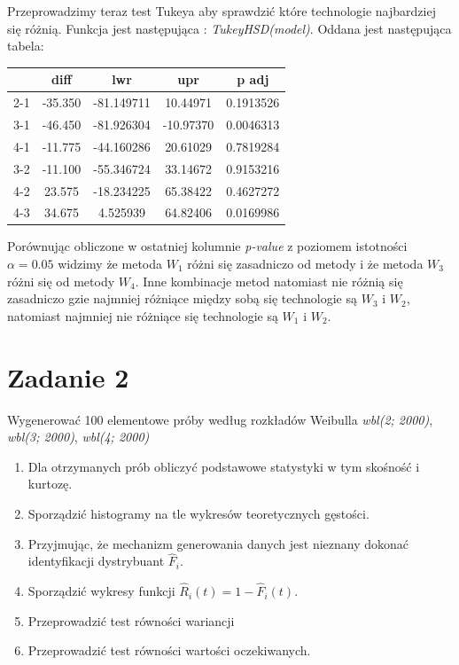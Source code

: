 \documentclass{article}
\begin{document}
Przeprowadzimy teraz test Tukeya aby sprawdzić które technologie najbardziej się różnią. Funkcja jest następująca : \textit{TukeyHSD(model)}. Oddana jest następująca tabela:
\begin{center} \begin{tabular}{|c|c|c|c|c|} \hline
& diff & lwr & upr & p adj \\ \hline
2-1 & -35.350 & -81.149711 & 10.44971 & 0.1913526 \\ \hline
3-1 & -46.450 & -81.926304 & -10.97370 & 0.0046313 \\ \hline
4-1 & -11.775 & -44.160286 & 20.61029 & 0.7819284 \\ \hline
3-2 & -11.100 & -55.346724 & 33.14672 & 0.9153216 \\ \hline
4-2 & 23.575 & -18.234225 & 65.38422 & 0.4627272 \\ \hline
4-3 & 34.675 & 4.525939 & 64.82406 & 0.0169986 \\ \hline
\end{tabular} \end{center}
Porównując obliczone w ostatniej kolumnie \textit{p-value} z poziomem istotności $\alpha = 0.05$ widzimy że metoda $W_1$ różni się zasadniczo od metody i że metoda $W_3$ różni się od metody $W_4$. Inne kombinacje metod natomiast nie różnią się zasadniczo gzie najmniej różniące między sobą się technologie są $W_3$ i $W_2$, natomiast najmniej nie różniące się technologie są $W_1$ i $W_2$. 

\newpage
\section{Zadanie 2}
Wygenerować 100 elementowe próby według rozkładów Weibulla \textit{wbl(2; 2000)}, \textit{wbl(3; 2000)}, \textit{wbl(4; 2000)}
\begin{enumerate}[label = \alph*)]
\item Dla otrzymanych prób obliczyć podstawowe statystyki w tym skośność i kurtozę.
\item Sporządzić histogramy na tle wykresów teoretycznych gęstości.
\item Przyjmując, że mechanizm generowania danych jest nieznany dokonać identyfikacji
dystrybuant $\hat{F}_i$.
\item Sporządzić wykresy funkcji $\hat{R}_i(t) = 1 - \hat{F}_i(t)$.
\item Przeprowadzić test równości wariancji
\item Przeprowadzić test równości wartości oczekiwanych. 
\end{enumerate}
\end{document}
